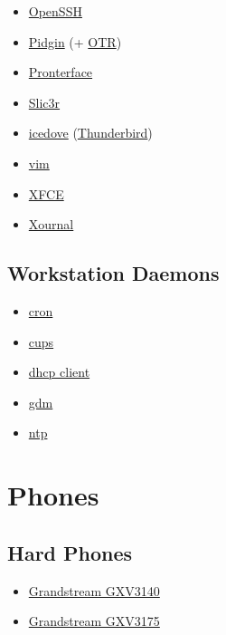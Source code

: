 \begin{itemize}
\item \href{http://www.openssh.com/}{OpenSSH}
\item \href{http://www.pidgin.im/}{Pidgin} (+ \href{https://otr.cypherpunks.ca/}{OTR})
\item \href{https://github.com/kliment/Printrun}{Pronterface}
\item \href{http://slic3r.org/}{Slic3r}
\item \href{https://wiki.debian.org/Icedove}{icedove} (\href{http://www.mozilla.org/en-US/thunderbird/}{Thunderbird})
\item \href{http://www.vim.org/}{vim}
\item \href{http://www.xfce.org/}{XFCE}
\item \href{http://xournal.sourceforge.net/}{Xournal}
\end{itemize}

\subsection{Workstation Daemons}
\begin{itemize}
\item \href{http://ftp.isc.org/isc/cron/}{cron}
\item \href{http://www.cups.org/}{cups}
\item \href{http://www.isc.org/}{dhcp client}
\item \href{https://wiki.gnome.org/Projects/GDM}{gdm}
\item \href{http://support.ntp.org/}{ntp}
\end{itemize}

\section{Phones}
\subsection{Hard Phones}
\begin{itemize}
\item \href{https://www.grandstream.com/products/ip-video-telephony/gxv3140/}{Grandstream GXV3140}
\item \href{https://www.gr/ndstream.com/products/ip-video-telephony/gxv3175/}{Grandstream GXV3175}
\end{itemize}


